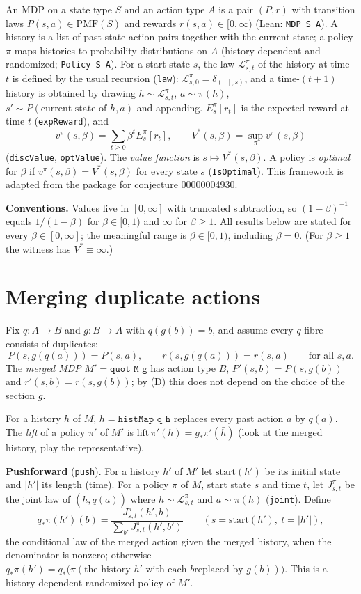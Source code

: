 \documentclass[11pt]{article}
\theoremstyle{definition}
\theoremstyle{remark}
\renewcommand{\_}{\oldus\allowbreak}
\begin{document}
An MDP on a state type $S$ and an action type $A$ is a pair $(P,r)$ with transition laws
$P(s,a)\in\mathrm{PMF}(S)$ and rewards $r(s,a)\in[0,\infty)$ (Lean: \texttt{MDP S A}). A history is
a list of past state-action pairs together with the current state; a policy $\pi$ maps histories to
probability distributions on $A$ (history-dependent and randomized; \texttt{Policy S A}). For a
start state $s$, the law $\mathcal L^\pi_{s,t}$ of the history at time $t$ is defined by the usual
recursion (\texttt{law}): $\mathcal L^\pi_{s,0}=\delta_{([],s)}$, and a time-$(t+1)$ history is
obtained by drawing $h\sim\mathcal L^\pi_{s,t}$, $a\sim\pi(h)$, $s'\sim P(\text{current state of }
h,a)$ and appending. $E^\pi_s[r_t]$ is the expected reward at time $t$ (\texttt{expReward}), and
\[
  v^\pi(s,\beta)=\sum_{t\ge0}\beta^t E^\pi_s[r_t],\qquad
  V^*(s,\beta)=\sup_\pi v^\pi(s,\beta)
\]
(\texttt{discValue}, \texttt{optValue}). The \emph{value function} is $s\mapsto V^*(s,\beta)$. A
policy is \emph{optimal} for $\beta$ if $v^\pi(s,\beta)=V^*(s,\beta)$ for every state $s$
(\texttt{IsOptimal}). This framework is adapted from the package for conjecture 00000004930.

\textbf{Conventions.} Values live in $[0,\infty]$ with truncated subtraction, so $(1-\beta)^{-1}$
equals $1/(1-\beta)$ for $\beta\in[0,1)$ and $\infty$ for $\beta\ge1$. All results below are
stated for every $\beta\in[0,\infty]$; the meaningful range is $\beta\in[0,1)$, including
$\beta=0$. (For $\beta\ge1$ the witness has $V^*\equiv\infty$.)

\section{Merging duplicate actions}

Fix $q:A\to B$ and $g:B\to A$ with $q(g(b))=b$, and assume every $q$-fibre consists of
duplicates:
\[
  P(s,g(q(a)))=P(s,a),\qquad r(s,g(q(a)))=r(s,a)\qquad\text{for all }s,a. \tag{D}
\]
The \emph{merged MDP} $M'=\texttt{quot M g}$ has action type $B$, $P'(s,b)=P(s,g(b))$ and
$r'(s,b)=r(s,g(b))$; by (D) this does not depend on the choice of the section $g$.

For a history $h$ of $M$, $\bar h=\texttt{histMap q h}$ replaces every past action $a$ by $q(a)$.
The \emph{lift} of a policy $\pi'$ of $M'$ is $\mathrm{lift}\,\pi'(h)=g_*\pi'(\bar h)$ (look at the
merged history, play the representative).

\textbf{Pushforward} (\texttt{push}). For a history $h'$ of $M'$ let $\mathrm{start}(h')$ be its
initial state and $|h'|$ its length (time). For a policy $\pi$ of $M$, start state $s$ and time
$t$, let $J^\pi_{s,t}$ be the joint law of $(\bar h,q(a))$ where $h\sim\mathcal L^\pi_{s,t}$ and
$a\sim\pi(h)$ (\texttt{joint}). Define
\[
  q_*\pi(h')(b)=\frac{J^\pi_{s,t}(h',b)}{\sum_{b'}J^\pi_{s,t}(h',b')}\qquad
  (s=\mathrm{start}(h'),\ t=|h'|),
\]
the conditional law of the merged action given the merged history, when the denominator is
nonzero; otherwise $q_*\pi(h')=q_*\bigl(\pi(\text{the history }h'\text{ with each }b\text{
replaced by }g(b))\bigr)$. This is a history-dependent randomized policy of $M'$.
\end{document}
